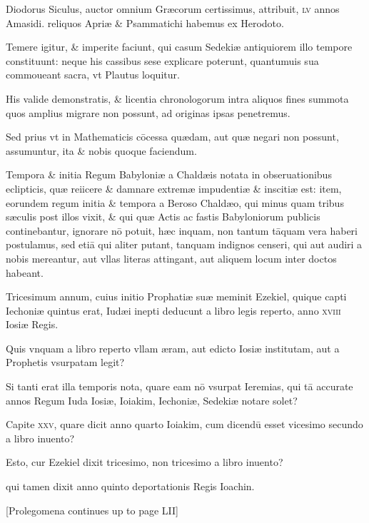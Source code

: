 \begin{parnumbers}
Diodorus Siculus,
auctor omnium Græcorum certissimus, attribuit, \textsc{lv} annos Amasidi. reliquos Apriæ \& Psammatichi habemus ex Herodoto.

Temere igitur, \& imperite faciunt, qui casum Sedekiæ antiquiorem illo tempore constituunt: neque his cassibus sese explicare poterunt,
quantumuis sua commoueant sacra, vt Plautus loquitur.

His valide
demonstratis, \& licentia chronologorum intra aliquos fines summota
quos amplius migrare non possunt, ad originas ipsas penetremus.

Sed prius vt in Mathematicis cōcessa quædam, aut quæ negari
non possunt, assumuntur, ita \& nobis quoque faciendum.

Tempora \& initia Regum Babyloniæ a Chaldæis notata in obseruationibus
eclipticis, quæ reiicere \& damnare extremæ impudentiæ \&
inscitiæ est: item, eorundem regum initia \& tempora a Beroso Chaldæo,
qui minus quam tribus sæculis post illos vixit, \& qui quæ Actis
ac fastis Babyloniorum publicis continebantur, ignorare nō potuit,
hæc inquam, non tantum tāquam vera haberi postulamus, sed etiā
qui aliter putant, tanquam indignos censeri, qui aut audiri a nobis
mereantur, aut vllas literas attingant, aut aliquem locum inter
doctos habeant.

Tricesimum annum, cuius initio Prophatiæ suæ
meminit Ezekiel, quique capti Iechoniæ quintus erat, Iudæi inepti
deducunt a libro legis reperto, anno \textsc{xviii} Iosiæ Regis.

Quis vnquam a libro reperto vllam æram, aut edicto Iosiæ institutam, aut a
Prophetis vsurpatam legit?

Si tanti erat illa temporis nota, quare
eam nō vsurpat Ieremias, qui tā accurate annos Regum Iuda Iosiæ,
Ioiakim, Iechoniæ, Sedekiæ notare solet?

Capite \textsc{xxv}, quare dicit
anno quarto Ioiakim, cum dicendū esset vicesimo secundo a libro
inuento?

Esto, cur Ezekiel dixit tricesimo, non tricesimo a libro inuento?

qui tamen dixit anno quinto deportationis Regis Ioachin.

[Prolegomena continues up to page LII]

\end{parnumbers}
